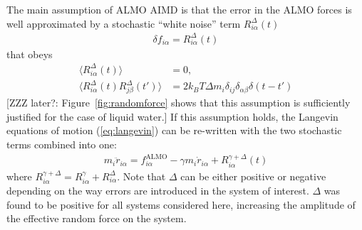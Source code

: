 \documentclass[aps,prl,reprint,amsmath,amssymb]{revtex4-1}
\begin{document}

The main assumption of ALMO AIMD is that the error in the ALMO forces is well approximated by a stochastic ``white noise'' term $R^{\Delta}_{i\alpha} (t)$
%
\begin{align}
\label{eq:assumption}
\delta f_{i\alpha} = R^{\Delta}_{i\alpha} (t)
\end{align}
%
that obeys
%
\begin{align}
\label{eq:stochastic2}
\langle R^{\Delta}_{i\alpha} (t) \rangle &= 0, \\
\label{eq:stochastic3}
\langle R^{\Delta}_{i\alpha} (t)  R^{\Delta}_{j\beta} (t') \rangle &= 2 k_B T \Delta m_i \delta_{ij} \delta_{\alpha\beta} \delta(t-t')
\end{align}
%
[ZZZ later?: Figure~\ref{fig:randomforce} shows that this assumption is sufficiently justified for the case of liquid water.] 
If this assumption holds, the Langevin equations of motion (\ref{eq:langevin}) can be re-written with the two stochastic terms combined into one:
%
\begin{align}
\label{eq:langevin2}
m_i \ddot{r}_{i\alpha} = f^{\text{ALMO}}_{i\alpha} - \gamma m_i \dot{r}_{i\alpha} + R^{\gamma + \Delta}_{i\alpha} (t)
\end{align}
%
where $R^{\gamma + \Delta}_{i\alpha} = R^{\gamma}_{i\alpha} + R^{\Delta}_{i\alpha}$. 
Note that $\Delta$ can be either positive or negative depending on the way errors are introduced in the system of interest. 
$\Delta$ was found to be positive for all systems considered here, increasing the amplitude of the effective random force on the system.

\end{document}
